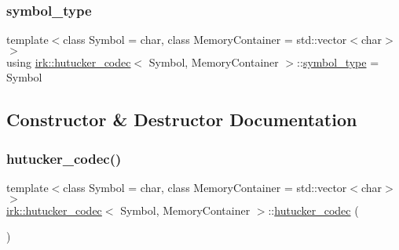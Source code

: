 \mbox{\label{classirk_1_1hutucker__codec_af23dee5959ae2a69eea0ab324cf6ecb6}} 
\subsubsection{\texorpdfstring{symbol\+\_\+type}{symbol\_type}}
{\footnotesize\ttfamily template$<$class Symbol = char, class Memory\+Container = std\+::vector$<$char$>$$>$ \\
using \mbox{\hyperlink{classirk_1_1hutucker__codec}{irk\+::hutucker\+\_\+codec}}$<$ Symbol, Memory\+Container $>$\+::\mbox{\hyperlink{classirk_1_1hutucker__codec_af23dee5959ae2a69eea0ab324cf6ecb6}{symbol\+\_\+type}} =  Symbol}



\subsection{Constructor \& Destructor Documentation}
\mbox{\label{classirk_1_1hutucker__codec_af44e54c9f8257df294e4c879d610281b}} 
\subsubsection{\texorpdfstring{hutucker\+\_\+codec()}{hutucker\_codec()}\hspace{0.1cm}{\footnotesize\ttfamily [1/4]}}
{\footnotesize\ttfamily template$<$class Symbol = char, class Memory\+Container = std\+::vector$<$char$>$$>$ \\
\mbox{\hyperlink{classirk_1_1hutucker__codec}{irk\+::hutucker\+\_\+codec}}$<$ Symbol, Memory\+Container $>$\+::\mbox{\hyperlink{classirk_1_1hutucker__codec}{hutucker\+\_\+codec}} (\begin{DoxyParamCaption}\item[{const \mbox{\hyperlink{classirk_1_1hutucker__codec}{hutucker\+\_\+codec}}$<$ Symbol, Memory\+Container $>$ \&}]{ }\end{DoxyParamCaption})\hspace{0.3cm}{\ttfamily [default]}}

